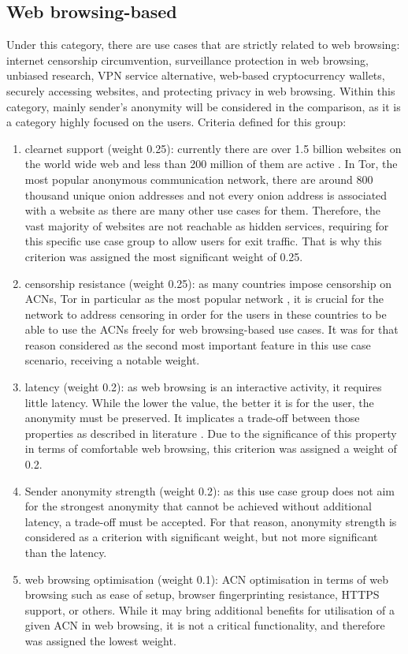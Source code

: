 \subsection{Web browsing-based}
Under this category, there are use cases that are strictly related to web browsing: internet censorship circumvention, surveillance protection in web browsing, unbiased research, VPN service alternative, web-based cryptocurrency wallets, securely accessing websites, and protecting privacy in web browsing.
Within this category, mainly sender’s anonymity will be considered in the comparison, as it is a category highly focused on the users.
Criteria defined for this group:
\begin{enumerate}
    \item clearnet support (weight 0.25): currently there are over 1.5 billion websites on the world wide web and less than 200 million of them are active \cite{internetlivestats}. In Tor, the most popular anonymous communication network, there are around 800 thousand unique onion addresses \cite{tor-metrics, tor-metrics2} and not every onion address is associated with a website as there are many other use cases for them. Therefore, the vast majority of websites are not reachable as hidden services, requiring for this specific use case group to allow users for exit traffic. That is why this criterion was assigned the most significant weight of 0.25.
    \item censorship resistance (weight 0.25): as many countries impose censorship on ACNs, Tor in particular as the most popular network \cite{gfw-china, africa}, it is crucial for the network to address censoring in order for the users in these countries to be able to use the ACNs freely for web browsing-based use cases. It was for that reason considered as the second most important feature in this use case scenario, receiving a notable weight.
    \item latency (weight 0.2): as web browsing is an interactive activity, it requires little latency. While the lower the value, the better it is for the user, the anonymity must be preserved. It implicates a trade-off between those properties as described in literature \cite{tor-design}. Due to the significance of this property in terms of comfortable web browsing, this criterion was assigned a weight of 0.2.
    \item Sender anonymity strength (weight 0.2): as this use case group does not aim for the strongest anonymity that cannot be achieved without additional latency, a trade-off must be accepted. For that reason, anonymity strength is considered as a criterion with significant weight, but not more significant than the latency.
    \item web browsing optimisation (weight 0.1): ACN optimisation in terms of web browsing such as ease of setup, browser fingerprinting resistance, HTTPS support, or others. While it may bring additional benefits for utilisation of a given ACN in web browsing, it is not a critical functionality, and therefore was assigned the lowest weight.
\end{enumerate}

